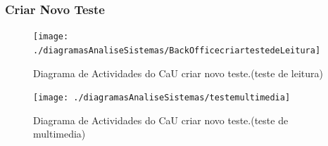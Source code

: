 \documentclass[a4paper]{article}
\begin{document}
	\subsubsection{Criar Novo Teste}
							
	\begin{figure}[h]
\centering
\texttt{[image: ./diagramasAnaliseSistemas/BackOfficecriartestedeLeitura]}
\caption{Diagrama de Actividades do CaU criar novo teste.(teste de leitura)}
\label{fig:BackOfficecriartestedeLeitura}
\end{figure}

\begin{figure}[h]
\centering
\texttt{[image: ./diagramasAnaliseSistemas/testemultimedia]}
\caption{Diagrama de Actividades do CaU criar novo teste.(teste de multimedia)}
\label{fig:testemultimedia}
\end{figure}



								
			
\end{document}
